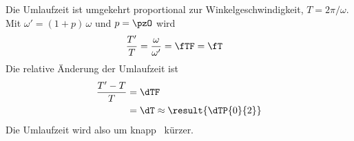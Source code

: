 Die Umlaufzeit ist umgekehrt proportional zur Winkelgeschwindigkeit, $T = 2\pi/\omega$. Mit $\omega' = (1+p)\,\omega$ und $p = \pzO$ wird
\begin{align}
 \frac{T'}{T} &= \frac{\omega}{\omega'} = \fTF = \fT
\end{align}
Die relative Änderung der Umlaufzeit ist
\begin{align}
 \frac{T'-T}{T} &= \dTF \\
   &= \dT \approx \result{\dTP{0}{2}}
\end{align}
Die Umlaufzeit wird also um knapp \pzO\ kürzer.
